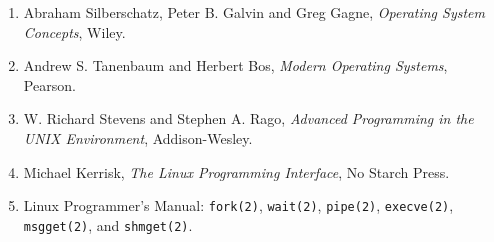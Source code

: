 \documentclass[12pt,a4paper]{report}
\begin{document}
\begin{enumerate}

    \item Abraham Silberschatz, Peter B. Galvin and Greg Gagne,
    \textit{Operating System Concepts}, Wiley.

    \item Andrew S. Tanenbaum and Herbert Bos,
    \textit{Modern Operating Systems}, Pearson.

    \item W. Richard Stevens and Stephen A. Rago,
    \textit{Advanced Programming in the UNIX Environment},
    Addison-Wesley.

    \item Michael Kerrisk,
    \textit{The Linux Programming Interface},
    No Starch Press.

    \item Linux Programmer's Manual:
    \texttt{fork(2)}, \texttt{wait(2)}, \texttt{pipe(2)},
    \texttt{execve(2)}, \texttt{msgget(2)}, and
    \texttt{shmget(2)}.

\end{enumerate}

\end{document}
